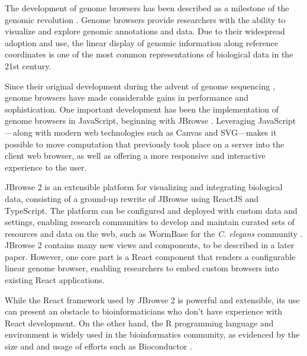 \documentclass{bioinfo}
\begin{document}
The development of genome browsers has been described as
a milestone of the genomic revolution
\citep{packer2007clickable}. Genome browsers provide researchers with the
ability to visualize and explore genomic annotations and data.
Due to their widespread adoption and use, the linear display of genomic
information along reference coordinates is one of the most common
representations of biological data in the 21st century.

Since their original development during the advent of genome sequencing
\citep{kent2002human, birney2004overview}, genome browsers have made
considerable gains in performance and sophistication. One important
development has been the implementation of genome browsers in
JavaScript, beginning with JBrowse \citep{buels2016jbrowse}. Leveraging
JavaScript---along with modern web technologies such as Canvas and SVG---makes it possible to move computation that previously took
place on a server into the client web browser, as well as offering a more responsive and
interactive experience to the user.

JBrowse 2 is an extensible platform for visualizing and integrating biological data,
consisting of a ground-up rewrite of JBrowse using ReactJS and TypeScript.
The platform can be configured and deployed with custom data and settings,
enabling research communities to develop and maintain
curated sets of resources and data on the web, such as WormBase for the
\emph{C. elegans} community \citep{harris2010wormbase}.
JBrowse 2 contains many new views and components, to be described in a later paper.
However, one core part is a React component that renders a configurable
linear genome browser, enabling researchers to embed custom browsers into
existing React applications.

While the React framework used by JBrowse 2 is powerful and extensible, its use can
present an obstacle to bioinformaticians who don't have
experience with React development. On the other hand, the R programming
language and environment is widely used in the bioinformatics community,
as evidenced by the size and and usage of efforts such as Bioconductor
\citep{huber2015orchestrating}.
\end{document}

